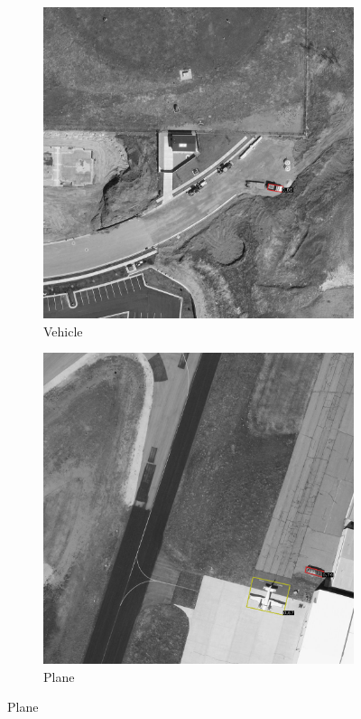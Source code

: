 \begin{figure}[h!]
    \begin{subfigure}[t]{0.38\textwidth}
        \centering
        \includegraphics[width=\linewidth]{images/015Results/03ablation/comp_images/green/427.png}
        \caption{Vehicle}
    \end{subfigure}
    \begin{subfigure}[t]{0.38\textwidth}
        \centering
        \includegraphics[width=\linewidth]{images/015Results/03ablation/comp_images/green/487.png}
        \caption{Plane}
    \end{subfigure}
    

\end{figure}
